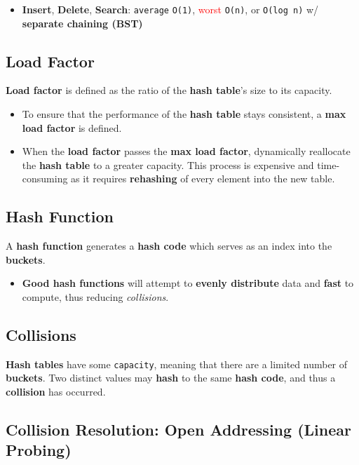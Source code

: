 \documentclass[12pt, letterpaper]{article}
\begin{document}
\begin{itemize}
    \item \textbf{Insert}, \textbf{Delete}, \textbf{Search}: \texttt{average} \texttt{O(1)}, \textcolor{red}{worst} \texttt{O(n)}, or \texttt{O(log n)} w/ \textbf{separate chaining (BST)}
\end{itemize}

\subsection*{Load Factor}

\textbf{Load factor} is defined as the ratio of the \textbf{hash table}'s size to its capacity.

\begin{itemize}
    \item To ensure that the performance of the \textbf{hash table} stays consistent, a \textbf{max load factor} is defined.
    \item When the \textbf{load factor} passes the \textbf{max load factor}, dynamically reallocate the \textbf{hash table} to a greater capacity. This process is expensive and time-consuming as it requires \textbf{rehashing} of every element into the new table.
\end{itemize}

\subsection*{Hash Function}

A \textbf{hash function} generates a \textbf{hash code} which serves as an index into the \textbf{buckets}.

\begin{itemize}
    \item \textbf{Good hash functions} will attempt to \textbf{evenly distribute} data and \textbf{fast} to compute, thus reducing \textit{collisions}.
\end{itemize}

\subsection*{Collisions}

\textbf{Hash tables} have some \texttt{capacity}, meaning that there are a limited number of \textbf{buckets}. Two distinct values may \textbf{hash} to the same \textbf{hash code}, and thus a \textbf{collision} has occurred.

\subsection*{Collision Resolution: Open Addressing (Linear Probing)}
\end{document}

